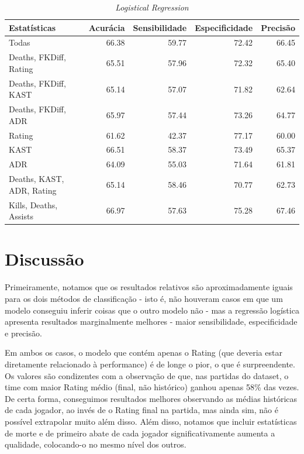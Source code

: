 \documentclass[12pt]{article}
\begin{document}
\begin{table}[!h]
  \begin{center}
    \caption{\textit{Logistical Regression}}
    \begin{tabular}{l|rrrr}
      \toprule
      Estatísticas & Acurácia & Sensibilidade & Especificidade & Precisão \\ \midrule
      Todas                     & 66.38 & {\color{Green} 59.77} & 72.42 & 66.45 \\
      \midrule
      Deaths, FKDiff, Rating    & 65.51 & 57.96 & 72.32 & 65.40 \\
      Deaths, FKDiff, KAST      & 65.14 & 57.07 & 71.82 & 62.64 \\
      Deaths, FKDiff, ADR       & 65.97 & 57.44 & 73.26 & 64.77 \\
      \midrule
      Rating                    & {\color{Red} 61.62} & {\color{Red} 42.37} & {\color{Green} 77.17} & {\color{Red} 60.00} \\
      KAST                      & 66.51 & 58.37 & 73.49 & 65.37 \\
      ADR                       & 64.09 & 55.03 & 71.64 & 61.81 \\
      \midrule
      Deaths, KAST, ADR, Rating & 65.14 & 58.46 & 70.77 & 62.73 \\
      Kills, Deaths, Assists    & {\color{Green} 66.97} & 57.63 & 75.28 & {\color{Green} 67.46} \\
      \bottomrule
    \end{tabular}
  \end{center}
\end{table}

\section{Discussão}

Primeiramente, notamos que os resultados relativos são aproximadamente iguais para os dois métodos de classificação - isto é, não houveram casos em que um modelo conseguiu inferir coisas que o outro modelo não - mas a regressão logística apresenta resultados marginalmente melhores - maior sensibilidade, especificidade e precisão.

Em ambos os casos, o modelo que contém apenas o Rating (que deveria estar diretamente relacionado à performance) é de longe o pior, o que é surpreendente. Os valores são condizentes com a observação de que, nas partidas do dataset, o time com maior Rating médio (final, não histórico) ganhou apenas 58\% das vezes. De certa forma, conseguimos resultados melhores observando as médias históricas de cada jogador, ao invés de o Rating final na partida, mas ainda sim, não é possível extrapolar muito além disso. Além disso, notamos que incluir estatísticas de morte e de primeiro abate de cada jogador significativamente aumenta a qualidade, colocando-o no mesmo nível dos outros.
\end{document}
